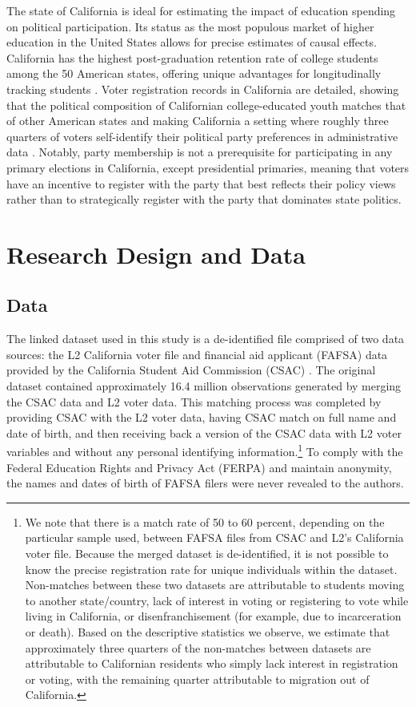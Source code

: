 \documentclass[12pt,letterpaper,oneside]{book}
\begin{document}
The state of California is ideal for estimating the impact of education spending on political participation. Its status as the most populous market of higher education in the United States allows for precise estimates of causal effects. California has the highest post-graduation retention rate of college students among the 50 American states, offering unique advantages for longitudinally tracking students \citep{van_dam_states_2022}. Voter registration records in California are detailed, showing that the political composition of Californian college-educated youth matches that of other American states and making California a setting where roughly three quarters of voters self-identify their political party preferences in administrative data \citep{firoozi_effect_2023}. Notably, party membership is not a prerequisite for participating in any primary elections in California, except presidential primaries, meaning that voters have an incentive to register with the party that best reflects their policy views rather than to strategically register with the party that dominates state politics.

\section{Research Design and Data} \label{sec:method}


    \subsection{Data} \label{sec:ch3_data}

The linked dataset used in this study is a de-identified file comprised of two data sources: the L2 California voter file and financial aid applicant (FAFSA) data provided by the California Student Aid Commission (CSAC) \citep{firoozi_code_2024}. The original dataset contained approximately 16.4 million observations generated by merging the CSAC data and L2 voter data. This matching process was completed by providing CSAC with the L2 voter data, having CSAC match on full name and date of birth, and then receiving back a version of the CSAC data with L2 voter variables and without any personal identifying information.\footnote{We note that there is a match rate of 50 to 60 percent, depending on the particular sample used, between FAFSA files from CSAC and L2's California voter file. Because the merged dataset is de-identified, it is not possible to know the precise registration rate for unique individuals within the dataset. Non-matches between these two datasets are attributable to students moving to another state/country, lack of interest in voting or registering to vote while living in California, or disenfranchisement (for example, due to incarceration or death). Based on the descriptive statistics we observe, we estimate that approximately three quarters of the non-matches between datasets are attributable to Californian residents who simply lack interest in registration or voting, with the remaining quarter attributable to migration out of California.} To comply with the Federal Education Rights and Privacy Act (FERPA) and maintain anonymity, the names and dates of birth of FAFSA filers were never revealed to the authors.
\end{document}
